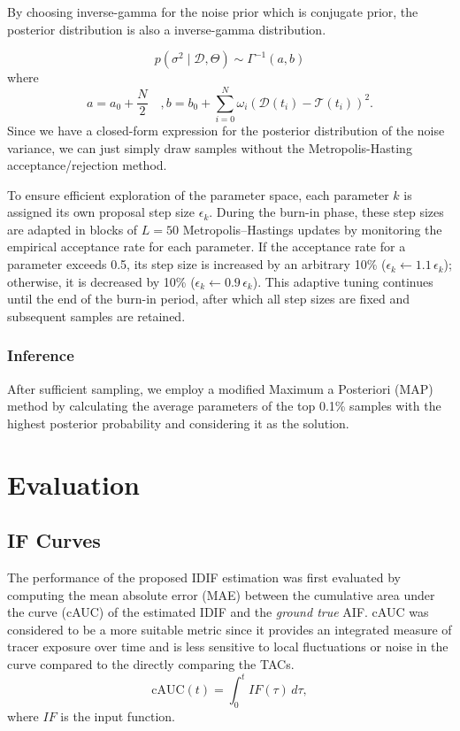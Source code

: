 By choosing inverse-gamma for the noise prior which is conjugate prior, the posterior distribution is also a inverse-gamma distribution.

\[
	p(\sigma^2 \mid \mathcal{D},\Theta) \sim \Gamma^{-1}(a, b)
\]
where
\[
	a=a_0 + \frac{N}{2} \quad, b= b_0 + \sum_{i=0}^N \omega_i(\mathcal{D}(t_i) - \mathcal{T}(t_i))^2.
\]
Since we have a closed-form expression for the posterior distribution of the noise variance, we can just simply draw samples without the Metropolis-Hasting acceptance/rejection method.

To ensure efficient exploration of the parameter space, each parameter \( k \) is assigned its own proposal step size \( \epsilon_k \).
During the burn-in phase, these step sizes are adapted in blocks of \( L = 50 \) Metropolis–Hastings updates by monitoring the empirical acceptance rate for each parameter.
If the acceptance rate for a parameter exceeds 0.5, its step size is increased by an arbitrary 10\% (\( \epsilon_k \leftarrow 1.1\,\epsilon_k \)); otherwise, it is decreased by 10\% (\( \epsilon_k \leftarrow 0.9\,\epsilon_k \)).
This adaptive tuning continues until the end of the burn-in period, after which all step sizes are fixed and subsequent samples are retained.

\subsubsection{Inference}
After sufficient sampling, we employ a modified Maximum a Posteriori (MAP) method by calculating the average parameters of the top 0.1\% samples with the highest posterior probability and considering it as the solution.



\section{Evaluation}
\subsection{IF Curves}
The performance of the proposed IDIF estimation was first evaluated by computing the mean absolute error (MAE) between the cumulative area under the curve (cAUC) of the estimated IDIF and the \textit{ground true} AIF. cAUC was considered to be a more suitable metric since it provides an integrated measure of tracer exposure over time and is less sensitive to local fluctuations or noise in the curve compared to the directly comparing the TACs.
\begin{equation}
	\textrm{cAUC}(t) =  \int_{0}^{t} IF(\tau) \, d\tau,
\end{equation}
where \(IF\) is the input function.

